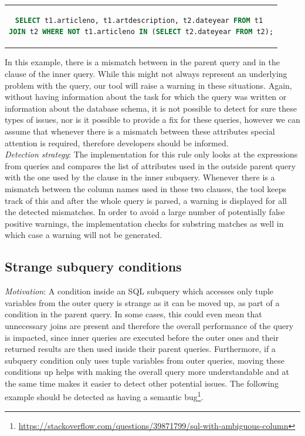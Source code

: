 \begin{center}
\begin{tabular}{c}
\begin{lstlisting}[language=SQL]
SELECT t1.articleno, t1.artdescription, t2.dateyear FROM t1 
JOIN t2 WHERE NOT t1.articleno IN (SELECT t2.dateyear FROM t2);
\end{lstlisting}
\end{tabular}
\end{center}

In this example, there is a mismatch between  in the parent query and  in the  clause of the inner query. While this might not always represent an underlying problem with the query, our tool will raise a warning in these situations. Again, without having information about the task for which the query was written or information about the database schema, it is not possible to detect for sure these types of issues, nor is it possible to provide a fix for these queries, however we can assume that whenever there is a mismatch between these attributes special attention is required, therefore developers should be informed.\\

\noindent \emph{Detection strategy}: The implementation for this rule only looks at the  expressions from queries and compares the list of attributes used in the outside parent query with the one used by the  clause in the inner subquery. Whenever there is a mismatch between the column names used in these two clauses, the tool keeps track of this and after the whole query is parsed, a warning is displayed for all the detected mismatches. In order to avoid a large number of potentially false positive warnings, the implementation checks for substring matches as well in which case a warning will not be generated.

\subsection{Strange subquery conditions}
\emph{Motivation}: A condition inside an SQL subquery which accesses only tuple variables from the outer query is strange as it can be moved up, as part of a condition in the parent query. In some cases, this could even mean that unnecessary joins are present and therefore the overall performance of the query is impacted, since inner queries are executed before the outer ones and their returned results are then used inside their parent queries. Furthermore, if a subquery condition only uses tuple variables from outer queries, moving these conditions up helps with making the overall query more understandable and at the same time makes it easier to detect other potential issues. The following example should be detected as having a semantic bug\footnote{\url{https://stackoverflow.com/questions/39871799/sql-with-ambiguous-column}}.

